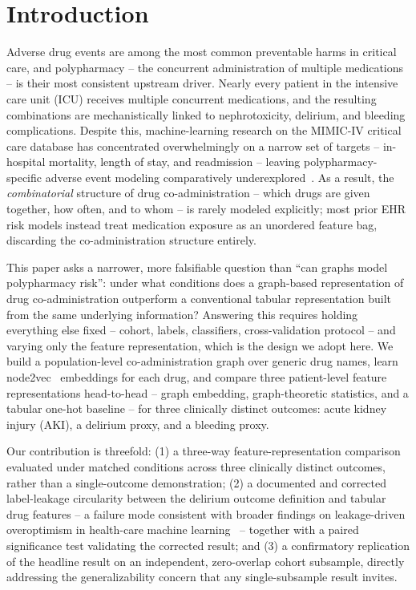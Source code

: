 \documentclass[conference]{IEEEtran}
\begin{document}
\section{Introduction}

Adverse drug events are among the most common preventable harms in
critical care, and polypharmacy -- the concurrent administration of
multiple medications -- is their most consistent upstream driver. Nearly
every patient in the intensive care unit (ICU) receives multiple concurrent
medications, and the resulting combinations are mechanistically linked to
nephrotoxicity, delirium, and bleeding complications. Despite this,
machine-learning research on the MIMIC-IV critical care database has
concentrated overwhelmingly on a narrow set of targets -- in-hospital
mortality, length of stay, and readmission -- leaving polypharmacy-specific
adverse event modeling comparatively
underexplored~\cite{harutyunyan2019benchmarking,rohr2024revisiting}. As a
result, the \emph{combinatorial} structure of drug co-administration --
which drugs are given together, how often, and to whom -- is rarely modeled
explicitly; most prior EHR risk models instead treat medication exposure as
an unordered feature bag, discarding the co-administration structure
entirely.

This paper asks a narrower, more falsifiable question than ``can graphs
model polypharmacy risk'': under what conditions does a graph-based
representation of drug co-administration outperform a conventional tabular
representation built from the same underlying information? Answering this
requires holding everything else fixed -- cohort, labels, classifiers,
cross-validation protocol -- and varying only the feature representation,
which is the design we adopt here. We build a population-level
co-administration graph over generic drug names, learn
node2vec~\cite{grover2016node2vec} embeddings for each drug, and compare
three patient-level feature representations head-to-head -- graph
embedding, graph-theoretic statistics, and a tabular one-hot baseline -- for
three clinically distinct outcomes: acute kidney injury (AKI), a delirium
proxy, and a bleeding proxy.

Our contribution is threefold: (1) a three-way feature-representation
comparison evaluated under matched conditions across three clinically
distinct outcomes, rather than a single-outcome demonstration; (2) a
documented and corrected label-leakage circularity between the delirium
outcome definition and tabular drug features -- a failure mode consistent
with broader findings on leakage-driven overoptimism in health-care machine
learning~\cite{davis2023labelleakage,kapoor2023leakage} -- together with a
paired significance test validating the corrected result; and (3) a
confirmatory replication of the headline result on an independent,
zero-overlap cohort subsample, directly addressing the generalizability
concern that any single-subsample result invites.
\end{document}
